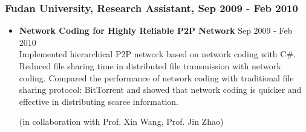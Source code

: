 \subsubsection{Fudan University, Research Assistant, Sep 2009 - Feb 2010}
\begin{itemize}
\item {\bf Network Coding for Highly Reliable P2P Network} \hfill Sep 2009 - Feb 2010\\
Implemented hierarchical P2P network based on network coding with C$\#$. Reduced
file sharing time in distributed file transmission with network coding. Compared
the performance of network coding with traditional file sharing protocol:
BitTorrent and showed that network coding is quicker and effective in
distributing scarce information.

(in collaboration with Prof. Xin Wang, Prof. Jin Zhao)
\end{itemize}


\vspace{0.2in} %
